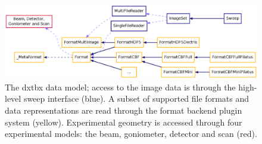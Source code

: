 \documentclass[preprint]{iucr}
\begin{document}
\onecolumn
\begin{figure}
\label{figure: data model}
\centering
\caption{The dxtbx data model; access to the image data is through the 
high-level sweep interface (blue). A subset of supported file formats and data 
representations are read through the format backend plugin system (yellow). 
Experimental geometry is accessed through four experimental models: the beam, 
goniometer, detector and scan (red).}
\includegraphics[width=\columnwidth]{./Figures/fig1.eps}
\end{figure}
\twocolumn
\end{document}
